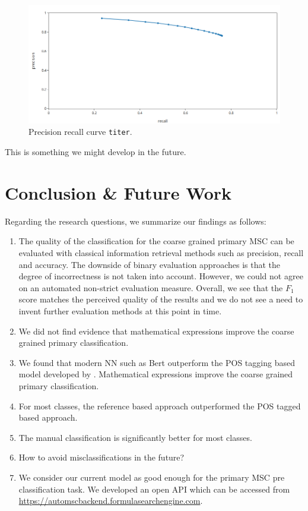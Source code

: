 \begin{figure}[h]
  \centering
  \includegraphics[width=1.1\textwidth]{prcurve.png}
  \caption{Precision recall curve \texttt{titer}.}
  \label{fgPR}
\end{figure}
This is something we might develop in the future.


\section{Conclusion \& Future Work}\label{sec.concl}
Regarding the research questions,
we summarize our findings as follows:
\begin{enumerate}
  \item The quality of the classification for the coarse grained primary MSC can be evaluated with classical information retrieval methods such as precision, recall and accuracy.
  The downside of binary evaluation approaches is that the degree of incorrectness is not taken into account.
  However, we could not agree on an automated non-strict evaluation measure. Overall, we see that the $F_1$ score matches the perceived quality of the results and we do not see a need to invent further evaluation methods at this point in time.
  \item We did not find evidence that mathematical expressions improve the coarse grained primary classification.
  \item We found that modern NN such as Bert outperform the POS tagging based model developed by \cite{SchonebergS14}. Mathematical expressions improve the coarse grained primary classification.
  \item For most classes, the reference based approach outperformed the POS tagged based approach.
  \item The manual classification is significantly better for most classes. 
  \item How to avoid misclassifications in the future?
  \item We consider our current model as good enough for the primary MSC pre classification task. We developed an open API which can be accessed from \url{https://automscbackend.formulasearchengine.com}.
\end{enumerate}

